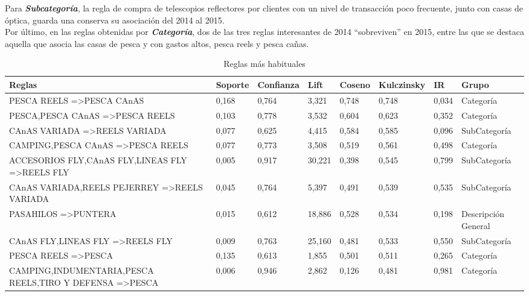 \documentclass[]{article}
\begin{document}
	Para \textbf{\textit{Subcategoría}}, la regla de compra de telescopios reflectores por clientes con un nivel de transacción poco frecuente, junto con casas de óptica, guarda una conserva su asociación del 2014 al 2015.\\ 
	
	Por último, en las reglas obtenidas por \textit{\textbf{Categoría}}, dos de las tres reglas interesantes de 2014 “sobreviven” en 2015, entre las que se destaca aquella que asocia las casas de pesca y con gastos altos, pesca reels y pesca cañas.\\
	
	
	\begin{landscape}
		
		\begin{table}[]
			\centering
			\caption{Reglas más habituales}
			\label{Tab_Reg_Habituales}%
			\begin{tabular}{llllllll}
				{\bf Reglas}                                                                         & {\bf Soporte} & {\bf Confianza} & {\bf Lift} & {\bf Coseno} & {\bf Kulczinsky} & {\bf IR} & {\bf Grupo} \\
				\hline
				PESCA REELS =\textgreater PESCA CAnAS                               & 0,168   & 0,764 & 3,321  & 0,748  & 0,748  & 0,034 & Categoría           \\
				PESCA,PESCA CAnAS =\textgreater PESCA REELS                         & 0,103   & 0,778 & 3,532  & 0,604  & 0,623  & 0,352 & Categoría           \\
				CAnAS VARIADA =\textgreater REELS VARIADA                           & 0,077   & 0,625 & 4,415  & 0,584  & 0,585  & 0,096 & SubCategoría        \\
				CAMPING,PESCA CAnAS =\textgreater PESCA REELS                       & 0,077   & 0,773 & 3,508  & 0,519  & 0,561  & 0,498 & Categoría           \\
				ACCESORIOS FLY,CAnAS FLY,LINEAS FLY =\textgreater REELS FLY         & 0,005   & 0,917 & 30,221 & 0,398  & 0,545  & 0,799 & SubCategoría        \\
				CAnAS VARIADA,REELS PEJERREY =\textgreater REELS VARIADA            & 0,045   & 0,764 & 5,397  & 0,491  & 0,539  & 0,535 & SubCategoría        \\
				PASAHILOS =\textgreater PUNTERA                                     & 0,015   & 0,612 & 18,886 & 0,528  & 0,534  & 0,198 & Descripción General \\
				CAnAS FLY,LINEAS FLY =\textgreater REELS FLY                        & 0,009   & 0,763 & 25,160 & 0,481  & 0,533  & 0,550 & SubCategoría        \\
				PESCA REELS =\textgreater PESCA                                     & 0,135   & 0,613 & 1,855  & 0,501  & 0,511  & 0,265 & Categoría           \\
				CAMPING,INDUMENTARIA,PESCA REELS,TIRO Y DEFENSA =\textgreater PESCA & 0,006   & 0,946 & 2,862  & 0,126  & 0,481  & 0,981 & Categoría          
			\end{tabular}
		\end{table}		
		

\end{landscape}
\end{document}
